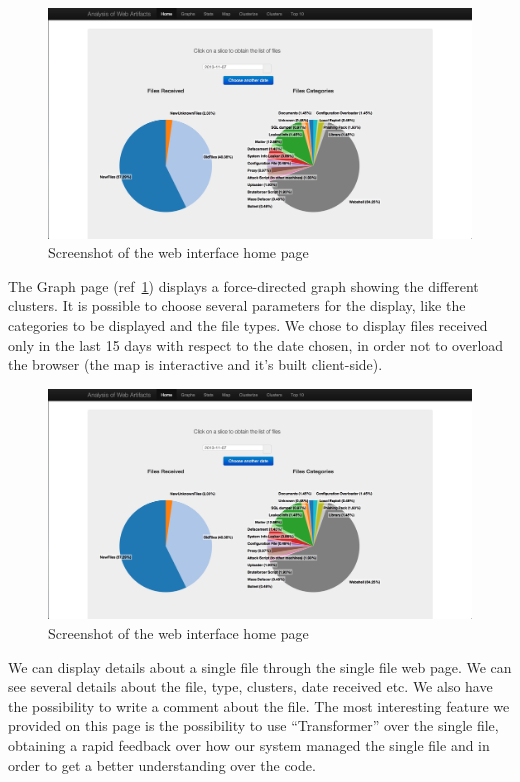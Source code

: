 \begin{figure}[tbh]
\centerline{\includegraphics[scale=0.2]{Images/honeyFace_home.jpg}}
\caption{Screenshot of the web interface home page\label{fig:web_home}}
\end{figure}

The Graph page (ref~\ref{fig:web_home}) displays a force-directed graph showing the different clusters. It is possible to choose several parameters for the display, like the categories to be displayed and the file types. We chose to display files received only in the last 15 days with respect to the date chosen, in order not to overload the browser (the map is interactive and it's built client-side).

\begin{figure}[tbh]
\centerline{\includegraphics[scale=0.2]{Images/honeyFace_home.jpg}}
\caption{Screenshot of the web interface home page\label{fig:web_home2}}
\end{figure}

We can display details about a single file through the single file web page. We can see several details about the file, type, clusters, date received etc. We also have the possibility to write a comment about the file.
The most interesting feature we provided on this page is the possibility to use ``Transformer'' over the single file, obtaining a rapid feedback over how our system managed the single file and in order to get a better understanding over the code.

